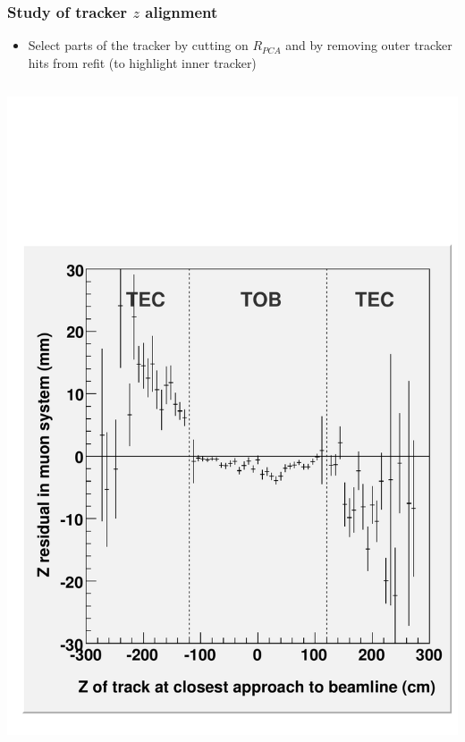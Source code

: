 \documentclass[compress]{beamer}
\begin{document}
\begin{frame}
\frametitle{Study of tracker $z$ alignment}

\begin{itemize}
\item Select parts of the tracker by cutting on $R_{PCA}$ and by removing outer tracker hits from refit (to highlight inner tracker)
\end{itemize}

\vfill
\begin{columns}
\includegraphics[width=\linewidth]{zresid_from_tracker_outerbottom.pdf}


\end{columns}
\end{frame}
\end{document}
